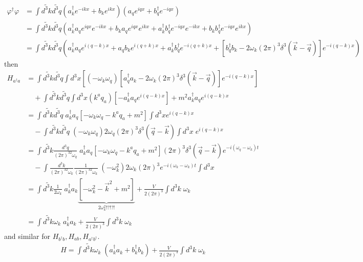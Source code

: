 \documentclass[10pt,a4paper]{book}
\theoremstyle{definition}
\begin{document}
\begin{align}
\varphi^\dagger\varphi&=\int\widetilde{d^3k}\widetilde{d^3q}\left(a^\dagger_ke^{-ikx}+b_ke^{ikx}\right)\left(a_qe^{iqx}+b^\dagger_qe^{-iqx}\right)\\
&=\int\widetilde{d^3k}\widetilde{d^3q}\left(a^\dagger_ka_qe^{iqx}e^{-ikx}+b_ka_qe^{iqx}e^{ikx}+a^\dagger_kb^\dagger_qe^{-iqx}e^{-ikx}+b_kb^\dagger_qe^{-iqx}e^{ikx}\right)\\
&=\int\widetilde{d^3k}\widetilde{d^3q}\left(a^\dagger_ka_qe^{i(q-k)x}+a_qb_ke^{i(q+k)x}+a^\dagger_kb^\dagger_qe^{-i(q+k)x}+[b^\dagger_qb_k-2\omega_k(2\pi)^3\delta^3(\vec{k}-\vec{q})]e^{-i(q-k)x}\right)
\end{align}
then
\begin{align}
H_{a^\dagger a}&=\int\widetilde{d^3k}\widetilde{d^3q}\int d^3x\left[(-\omega_k\omega_q)[a^\dagger_qa_k-2\omega_k(2\pi)^3\delta^3(\vec{k}-\vec{q})]e^{-i(q-k)x}\right]\\
&\quad+\int\widetilde{d^3k}\widetilde{d^3q}\int d^3x(k^aq_a)\left[-a^\dagger_ka_qe^{i(q-k)x}\right]+m^2a^\dagger_ka_qe^{i(q-k)x}\\
&=\int\widetilde{d^3k}\widetilde{d^3q}\;a^\dagger_ka_q\left[-\omega_k\omega_q-k^aq_a+m^2\right]\int d^3xe^{i(q-k)x}\\
&\quad-\int\widetilde{d^3k}\widetilde{d^3q}\;(-\omega_k\omega_q)2\omega_q(2\pi)^3\delta^3(\vec{q}-\vec{k})\int d^3x\;e^{i(q-k)x}\\
&=\int\widetilde{d^3k}\frac{d^3q}{(2\pi)^32\omega_q}\;a^\dagger_ka_q\left[-\omega_k\omega_q-k^aq_a+m^2\right](2\pi)^3\delta^3(\vec{q}-\vec{k})e^{-i(\omega_q-\omega_k)t}\\
&\quad-\int\frac{d^3k}{(2\pi)^32\omega_k}\frac{1}{(2\pi)^32\omega_k}\;(-\omega_k^2)2\omega_k(2\pi)^3e^{-i(\omega_k-\omega_k)t}\int d^3x \\
&=\int\widetilde{d^3k}\frac{1}{2\omega_k}\;a^\dagger_ka_k\underbrace{\left[-\omega^2_k-\vec{k}^2+m^2\right]}_{2\omega_k^2!?!?!}+\frac{V}{2(2\pi)^3}\int d^3k\;\omega_k\\
&=\int\widetilde{d^3k}\omega_k\;a^\dagger_ka_k+\frac{V}{2(2\pi)^3}\int d^3k\;\omega_k
\end{align}
and similar for $H_{b^\dagger b},H_{ab},H_{a^\dagger b^\dagger}$.
\begin{align}
H=\int\widetilde{d^3k}\omega_k\;(a^\dagger_ka_k+b^\dagger_kb_k)+\frac{V}{2(2\pi)^3}\int d^3k\;\omega_k
\end{align}
\end{document}

